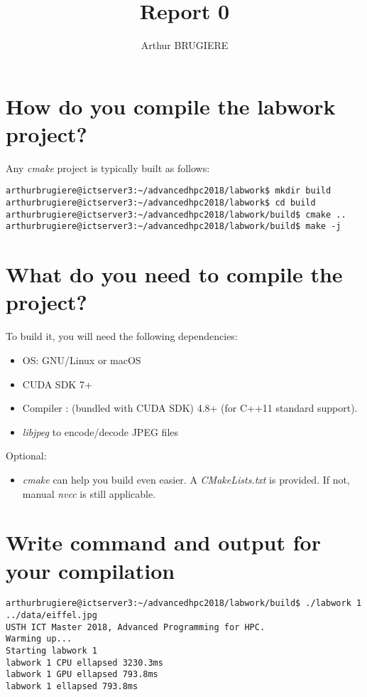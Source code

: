 \documentclass[11pt]{article} %
\title{Report 0}
\author{Arthur BRUGIERE}
\begin{document}
\maketitle

\section{How do you compile the labwork project?}

Any {\it cmake} project is typically built as follows:

\lstset{language=Bash}
\begin{lstlisting}
arthurbrugiere@ictserver3:~/advancedhpc2018/labwork$ mkdir build
arthurbrugiere@ictserver3:~/advancedhpc2018/labwork$ cd build
arthurbrugiere@ictserver3:~/advancedhpc2018/labwork/build$ cmake ..
arthurbrugiere@ictserver3:~/advancedhpc2018/labwork/build$ make -j
\end{lstlisting}

\section{What do you need to compile the project?}

To build it, you will need the following dependencies:

\begin{itemize}
	\item OS: GNU/Linux or macOS
	\item CUDA SDK 7+ 
	\item Compiler : 
			 (bundled with CUDA SDK)
			 4.8+ (for C++11 standard support).
	\item {\it libjpeg} to encode/decode JPEG files
\end{itemize}

Optional:

\begin{itemize}
\item  {\it cmake} can help you build even easier. A {\it CMakeLists.txt} is provided. If not, manual {\it nvcc} is still applicable.
\end{itemize}

\section{Write command and output for your compilation}

\lstset{language=Bash}
\begin{lstlisting}
arthurbrugiere@ictserver3:~/advancedhpc2018/labwork/build$ ./labwork 1 ../data/eiffel.jpg
USTH ICT Master 2018, Advanced Programming for HPC.
Warming up...
Starting labwork 1
labwork 1 CPU ellapsed 3230.3ms
labwork 1 GPU ellapsed 793.8ms
labwork 1 ellapsed 793.8ms
\end{lstlisting}
\end{document}
